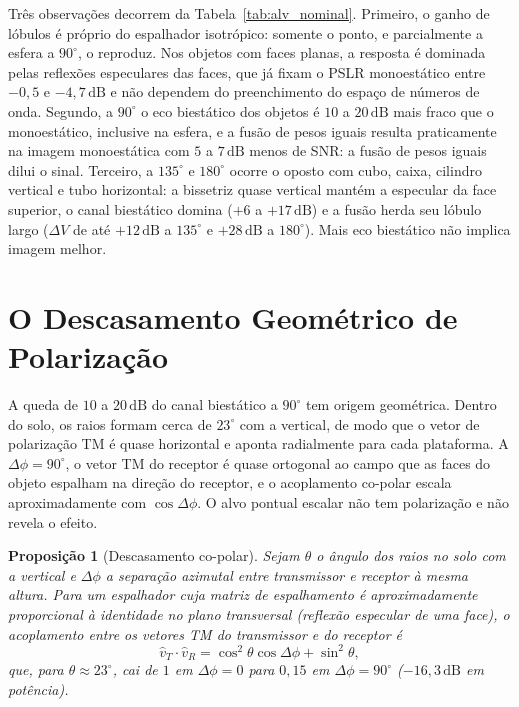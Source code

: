 \documentclass[12pt,a4paper,oneside]{book}
\theoremstyle{remark}
\newcommand{\dB}{\,\mathrm{dB}}
\theoremstyle{plain}
\newtheorem{proposicao}{Proposição}[chapter]
\theoremstyle{definition}
\begin{document}
Três observações decorrem da Tabela~\ref{tab:alv_nominal}. Primeiro, o ganho
de lóbulos é próprio do espalhador isotrópico: somente o ponto, e parcialmente
a esfera a $90^\circ$, o reproduz. Nos objetos com faces planas, a resposta é
dominada pelas reflexões especulares das faces, que já fixam o PSLR
monoestático entre $-0,5$ e $-4,7\dB$ e não dependem do preenchimento do espaço
de números de onda. Segundo, a $90^\circ$ o eco biestático dos objetos é
$10$ a $20\dB$ mais fraco que o monoestático, inclusive na esfera, e a fusão de
pesos iguais resulta praticamente na imagem monoestática com $5$ a $7\dB$ menos de
SNR: a fusão de pesos iguais dilui o sinal. Terceiro, a $135^\circ$ e
$180^\circ$ ocorre o oposto com cubo, caixa, cilindro vertical e tubo horizontal:
a bissetriz quase vertical mantém a especular da face superior, o canal
biestático domina ($+6$ a $+17\dB$) e a fusão herda seu lóbulo largo ($\Delta V$
de até $+12\dB$ a $135^\circ$ e $+28\dB$ a $180^\circ$). Mais eco biestático não
implica imagem melhor.

\section{O Descasamento Geométrico de Polarização}
\label{sec:alv_polarizacao}

A queda de $10$ a $20\dB$ do canal biestático a $90^\circ$ tem origem geométrica.
Dentro do solo, os raios formam cerca de $23^\circ$ com a vertical, de modo que o
vetor de polarização TM é quase horizontal e aponta radialmente para cada
plataforma. A $\Delta\phi=90^\circ$, o vetor TM do receptor é quase ortogonal ao
campo que as faces do objeto espalham na direção do receptor, e o acoplamento
co-polar escala aproximadamente com $\cos\Delta\phi$. O alvo pontual escalar
não tem polarização e não revela o efeito.

\begin{proposicao}[Descasamento co-polar]
\label{prop:descasamento}
Sejam $\theta$ o ângulo dos raios no solo com a vertical e $\Delta\phi$ a
separação azimutal entre transmissor e receptor à mesma altura. Para um
espalhador cuja matriz de espalhamento é aproximadamente proporcional à
identidade no plano transversal (reflexão especular de uma face), o acoplamento
entre os vetores TM do transmissor e do receptor é
\begin{equation}
  \hat v_T\cdot\hat v_R=\cos^2\theta\cos\Delta\phi+\sin^2\theta ,
\end{equation}
que, para $\theta\approx23^\circ$, cai de $1$ em $\Delta\phi=0$ para $0,15$ em
$\Delta\phi=90^\circ$ ($-16,3\dB$ em potência).
\end{proposicao}
\end{document}
